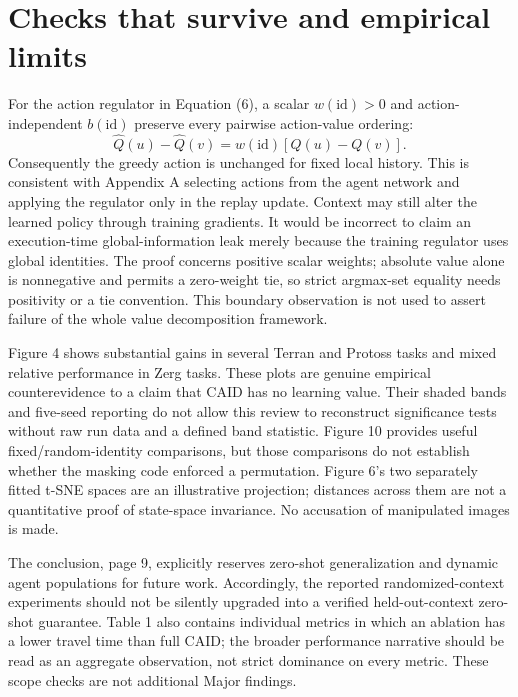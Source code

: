 \documentclass[10pt]{article}
\begin{document}
\section*{Checks that survive and empirical limits}
For the action regulator in Equation (6), a scalar \(w(\mathrm{id})>0\) and action-independent \(b(\mathrm{id})\) preserve every pairwise action-value ordering: \[\widehat Q(u)-\widehat Q(v)=w(\mathrm{id})[Q(u)-Q(v)].\] Consequently the greedy action is unchanged for fixed local history. This is consistent with Appendix A selecting actions from the agent network and applying the regulator only in the replay update. Context may still alter the learned policy through training gradients. It would be incorrect to claim an execution-time global-information leak merely because the training regulator uses global identities. The proof concerns positive scalar weights; absolute value alone is nonnegative and permits a zero-weight tie, so strict argmax-set equality needs positivity or a tie convention. This boundary observation is not used to assert failure of the whole value decomposition framework.\par
Figure 4 shows substantial gains in several Terran and Protoss tasks and mixed relative performance in Zerg tasks. These plots are genuine empirical counterevidence to a claim that CAID has no learning value. Their shaded bands and five-seed reporting do not allow this review to reconstruct significance tests without raw run data and a defined band statistic. Figure 10 provides useful fixed/random-identity comparisons, but those comparisons do not establish whether the masking code enforced a permutation. Figure 6’s two separately fitted t-SNE spaces are an illustrative projection; distances across them are not a quantitative proof of state-space invariance. No accusation of manipulated images is made.\par
The conclusion, page 9, explicitly reserves zero-shot generalization and dynamic agent populations for future work. Accordingly, the reported randomized-context experiments should not be silently upgraded into a verified held-out-context zero-shot guarantee. Table 1 also contains individual metrics in which an ablation has a lower travel time than full CAID; the broader performance narrative should be read as an aggregate observation, not strict dominance on every metric. These scope checks are not additional Major findings.\par
\end{document}

